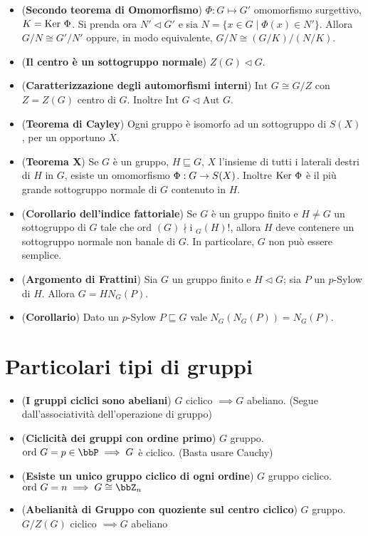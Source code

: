 \documentclass[a4paper,NoNotes,GeneralMath]{stdmdoc}
\newcommand{\Ord}{\text{ord }}
\newcommand{\sgr}{\sqsubseteq}
\newcommand{\nrm}{\lhd}
\newcommand{\Int}{\text{Int }}
\newcommand{\Ind}{\text{i }}
\newcommand{\Aut}{\text{Aut }}
\begin{document}
\begin{itemize}
		\item ({\bf Secondo teorema di Omomorfismo}) $\Phi: G \mapsto G'$ omomorfismo surgettivo, $K = \mbox{Ker } \Phi$. Si prenda ora $N' \nrm G'$ e sia $N = \{x \in G \mid \Phi(x) \in N'\}$. Allora $G/N \cong G'/N'$ oppure, in modo equivalente, $G/N \cong (G/K)/(N/K)$.
		\item ({\bf Il centro è un sottogruppo normale}) $Z(G) \nrm G$.
		\item ({\bf Caratterizzazione degli automorfismi interni}) $\Int G \cong G/Z$ con $Z = Z(G)$ centro di $G$. Inoltre $\Int G \nrm \Aut G$.
		\item ({\bf Teorema di Cayley}) Ogni gruppo è isomorfo ad un sottogruppo di $S(X)$, per un opportuno $X$.
		\item ({\bf Teorema X}) Se $G$ è un gruppo, $H \sgr G$, $X$ l'insieme di tutti i laterali destri di $H$ in $G$, esiste un omomorfismo $\Phi: G \rightarrow S(X)$. Inoltre $\mbox{Ker } \Phi$ è il più grande sottogruppo normale di $G$ contenuto in $H$.
		\item ({\bf Corollario dell'indice fattoriale}) Se $G$ è un gruppo finito e $H \neq G$ un sottogruppo di $G$ tale che $\Ord(G) \nmid \Ind_G(H)!$, allora $H$ deve contenere un sottogruppo normale non banale di $G$. In particolare, $G$ non può essere semplice.
		\item ({\bf Argomento di Frattini}) Sia $G$ un gruppo finito e $H \nrm G$; sia $P$ un $p$-Sylow di $H$. Allora $G=H N_{G}(P)$.
		\item ({\bf Corollario}) Dato un $p$-Sylow $P \sgr G$ vale $N_{G}(N_{G}(P)) = N_{G}(P)$.
	\end{itemize}

	\section*{Particolari tipi di gruppi}
	\begin{itemize}
		\item ({\bf I gruppi ciclici sono abeliani}) $G$ ciclico $\implies G$ abeliano. (Segue dall'associatività dell'operazione di gruppo)
		\item ({\bf Ciclicità dei gruppi con ordine primo}) $G$ gruppo. $\Ord G = p \in \bbP \implies G$ è ciclico. (Basta usare Cauchy)
		\item ({\bf Esiste un unico gruppo ciclico di ogni ordine}) $G$ gruppo ciclico. $\Ord G = n \implies G \cong \bbZ_{n}$
		\item ({\bf Abelianità di Gruppo con quoziente sul centro ciclico}) $G$ gruppo. $G/Z(G)$ ciclico $\implies G$ abeliano
	\end{itemize}
\end{document}
